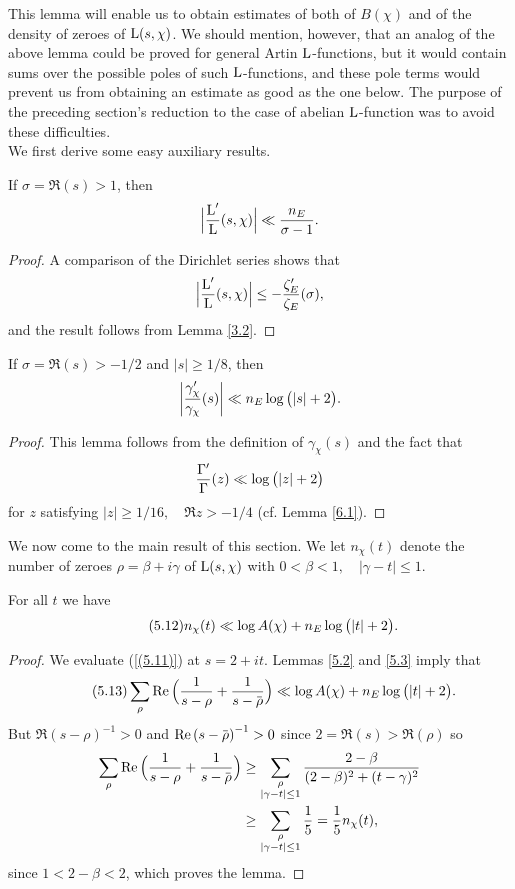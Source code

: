 \documentclass[./main]{subfiles}
\begin{document}
This lemma will enable us to obtain estimates of both of $B(\chi)$ and of the density of zeroes of $\operatorname{L}(s,\chi)$. We should mention, however, that an analog of the above lemma could be proved for general Artin $\operatorname{L}$-functions, but it would contain sums over the possible poles of such $\operatorname{L}$-functions, and these pole terms would prevent us from obtaining an estimate as good as the one below. The purpose of the preceding section's reduction to the case of abelian $\operatorname{L}$-function was to avoid these difficulties.\\
\indent We first derive some easy auxiliary results.
\begin{lemma}\label{5.2}
If $\sigma = \Re{(s)} > 1$, then
\[\Big| \frac{\operatorname{L}'}{\operatorname{L}}(s,\chi)\Big| \ll \frac{n_E}{\sigma-1}.\]
\end{lemma}
\begin{proof}
A comparison of the Dirichlet series shows that
\[\Big| \frac{\operatorname{L}'}{\operatorname{L}}(s,\chi)\Big| \leq -\frac{\zeta'_E}{\zeta_E}(\sigma),\]
and the result follows from Lemma \ref{3.2}.
\end{proof}
\begin{lemma}\label{5.3}
If $\sigma = \Re{(s)}>-1/2$ and $|s| \geq 1/8$, then
\[ \bigg| \frac{\gamma'_\chi}{\gamma_\chi}(s)\bigg| \ll n_E\log{\big(|s|+2\big)}.\]
\end{lemma}
\begin{proof}
This lemma follows from the definition of $\gamma_\chi(s)$ and the fact that
\[\frac{\Gamma'}{\Gamma}(z) \ll\log{\big(|z|+2\big)}\]
for $z$ satisfying $|z|\geq 1/16, \quad \Re{z} > -1/4$ \cite[p.251]{17-whittaker1996course} (cf. Lemma \ref{6.1}). 
\end{proof}
We now come to the main result of this section. We let $n_\chi(t)$ denote the number of zeroes $\rho = \beta + i\gamma$ of $\operatorname{L}(s,\chi)$ with $0<\beta<1, \quad |\gamma-t|\leq1$.
\begin{lemma}{\label{5.4}}
For all $t$ we have
\[\label{(5.12)}\tag{5.12} n_\chi(t)\ll\log{A(\chi)}+n_E\log{\big(|t|+2\big)}.\]
\end{lemma}
\begin{proof}
We evaluate (\ref{(5.11)}) at $s = 2 + it$. Lemmas \ref{5.2} and \ref{5.3} imply that
\[\tag{5.13}\label{(5.13)}\sum_{\rho}{\Re{\Big(\frac{1}{s-\rho}+\frac{1}{s-\xoverline{\rho}}\Big)}}\Vinogradov\log{A(\chi)}+n_E\log{\big(|t|+2\big)}.\]
But $\Re{(s-\rho)}^{-1}>0$ and $\Re{(s-\xoverline{\rho})}^{-1}>0$ since $2 = \Re{(s)} > \Re{(\rho)}$ so
\begin{align*}
   \sum_{\rho}{\Re{\Big(\frac{1}{s-\rho}+\frac{1}{s-\xoverline{\rho}}\Big)}} &\geq \sum_{\substack{\rho \\|\gamma-t|\leq1}}{\frac{2-\beta}{(2-\beta)^2+(t-\gamma)^2}}\\ &\geq\sum_{\substack{\rho \\|\gamma-t|\leq1}}{\frac{1}{5}} = \frac{1}{5}n_\chi(t),
\end{align*}
since $1<2-\beta<2$, which proves the lemma.
\end{proof}
\end{document}
